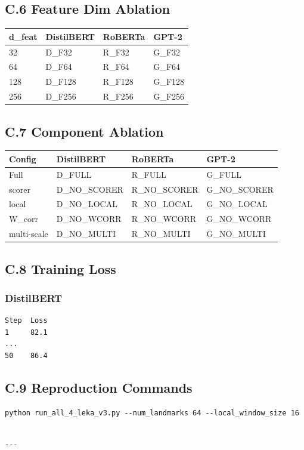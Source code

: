 \subsection{C.6 Feature Dim Ablation}

\begin{table}[H]
\centering
\small
\begin{tabular}{llll}
\toprule
\textbf{d\_feat} & \textbf{DistilBERT} & \textbf{RoBERTa} & \textbf{GPT-2} \\
\midrule
32 & {{D\_F32}} & {{R\_F32}} & {{G\_F32}} \\
64 & {{D\_F64}} & {{R\_F64}} & {{G\_F64}} \\
128 & {{D\_F128}} & {{R\_F128}} & {{G\_F128}} \\
256 & {{D\_F256}} & {{R\_F256}} & {{G\_F256}} \\
\bottomrule
\end{tabular}
\end{table}

\subsection{C.7 Component Ablation}

\begin{table}[H]
\centering
\small
\begin{tabular}{llll}
\toprule
\textbf{Config} & \textbf{DistilBERT} & \textbf{RoBERTa} & \textbf{GPT-2} \\
\midrule
Full & {{D\_FULL}} & {{R\_FULL}} & {{G\_FULL}} \\
scorer & {{D\_NO\_SCORER}} & {{R\_NO\_SCORER}} & {{G\_NO\_SCORER}} \\
local & {{D\_NO\_LOCAL}} & {{R\_NO\_LOCAL}} & {{G\_NO\_LOCAL}} \\
W\_corr & {{D\_NO\_WCORR}} & {{R\_NO\_WCORR}} & {{G\_NO\_WCORR}} \\
multi-scale & {{D\_NO\_MULTI}} & {{R\_NO\_MULTI}} & {{G\_NO\_MULTI}} \\
\bottomrule
\end{tabular}
\end{table}

\subsection{C.8 Training Loss}

\subsubsection{DistilBERT}
\begin{lstlisting}
Step  Loss
1     82.1
...
50    86.4
\end{lstlisting}

\subsection{C.9 Reproduction Commands}

\begin{lstlisting}
python run_all_4_leka_v3.py --num_landmarks 64 --local_window_size 16
\end{lstlisting}
\begin{lstlisting}

---
\end{lstlisting}